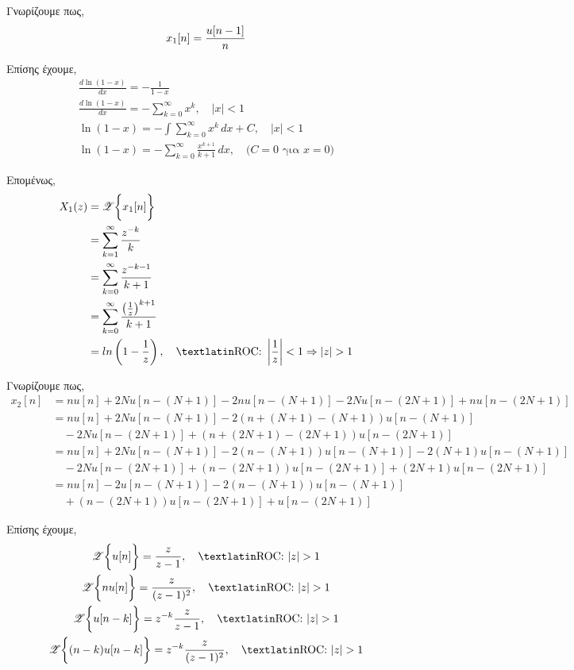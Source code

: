 \documentclass{assignment}
\begin{document}
\begin{answers}

\answer
Γνωρίζουμε πως,
\begin{equation*}
x_1[n] = \frac{u[n-1]}{n}\\
\end{equation*}

Επίσης έχουμε,
\begin{gather*}
\frac{d\ln(1-x)}{dx} = -\frac{1}{1-x}\\
\frac{d\ln(1-x)}{dx} = -\sum_{k=0}^{\infty} x^k,\quad|x| < 1\\
\ln(1-x) = -\int\sum_{k=0}^{\infty} x^k \,dx + C ,\quad |x| < 1\\
\ln(1-x) = -\sum_{k=0}^{\infty} \frac{x^{k+1}}{k+1} \, dx, \quad \text{($C = 0$ για $x = 0$)}
\end{gather*}

Επομένως,
\begin{align*}
X_1(z) &= \mathscr{Z}\bigg\{x_1[n]\bigg\} \\
       &= \sum_{k=1}^{\infty}\frac{z^{-k}}{k} \\
       &= \sum_{k=0}^{\infty}\frac{z^{-k-1}}{k+1} \\
       &= \sum_{k=0}^{\infty}\frac{\left(\frac{1}{z}\right)^{k+1}}{k+1}\\
       &= ln\left(1-\frac{1}{z}\right),\quad \text{\en{ROC: }}\left|\frac{1}{z}\right| < 1 \Rightarrow |z| > 1
\end{align*}


\answer
Γνωρίζουμε πως, 
\begin{align*} x_2[n] &= n u[n] + 2Nu[n-(N+1)] - 2 n u[n-(N+1)] - 2 N u[n-(2N+1)] + n u[n-(2N+1)] \\
                        &= n u[n] + 2Nu[n-(N+1)] - 2 (n + (N+1) - (N+1)) u[n-(N+1)] \\ 
                        &\quad - 2Nu[n-(2N+1)] + (n+(2N+1)-(2N+1))u[n-(2N+1)] \\
                        &= n u[n] + 2Nu[n-(N+1)] - 2(n-(N+1))u[n-(N+1)] - 2(N+1)u[n-(N+1)] \\
                        &\quad - 2Nu[n-(2N+1)] + (n-(2N+1))u[n-(2N+1)] + (2N+1)u[n-(2N+1)] \\
                        &= n u[n] - 2u[n-(N+1)] - 2(n-(N+1))u[n-(N+1)] \\
                        &\quad + (n-(2N+1))u[n-(2N+1)] + u[n-(2N+1)]
\end{align*}

Επίσης έχουμε, 
\begin{gather*}
\mathscr{Z}\bigg\{u[n]\bigg\} = \frac{z}{z-1},\quad \text{\en{ROC: }} |z| > 1 \\
\mathscr{Z}\bigg\{nu[n]\bigg\} = \frac{z}{(z-1)^2} ,\quad \text{\en{ROC: }} |z| > 1\\
\mathscr{Z}\bigg\{u[n-k]\bigg\} = z^{-k}\frac{z}{z-1},\quad \text{\en{ROC: }} |z| > 1 \\
\mathscr{Z}\bigg\{(n-k)u[n-k]\bigg\} = z^{-k}\frac{z}{(z-1)^2},\quad \text{\en{ROC: }} |z| > 1
\end{gather*}


\end{answers}
\end{document}
